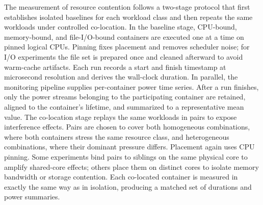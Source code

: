 The measurement of resource contention follows a two-stage protocol that first establishes isolated baselines for each workload class and then repeats the same workloads under controlled co-location. In the baseline stage, CPU-bound, memory-bound, and file-I/O-bound containers are executed one at a time on pinned logical CPUs. Pinning fixes placement and removes scheduler noise; for I/O experiments the file set is prepared once and cleaned afterward to avoid warm-cache artifacts. Each run records a start and finish timestamp at microsecond resolution and derives the wall-clock duration. In parallel, the monitoring pipeline supplies per-container power time series. After a run finishes, only the power streams belonging to the participating container are retained, aligned to the container’s lifetime, and summarized to a representative mean value.
The co-location stage replays the same workloads in pairs to expose interference effects. Pairs are chosen to cover both homogeneous combinations, where both containers stress the same resource class, and heterogeneous combinations, where their dominant pressure differs. Placement again uses CPU pinning. Some experiments bind pairs to siblings on the same physical core to amplify shared-core effects; others place them on distinct cores to isolate memory bandwidth or storage contention. Each co-located container is measured in exactly the same way as in isolation, producing a matched set of durations and power summaries.




